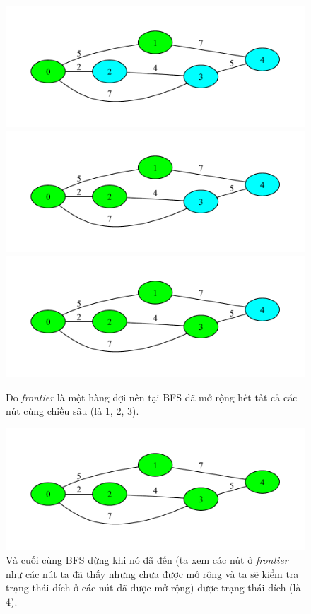 \begin{figure}[H]
    \centering
    \includegraphics[scale=0.7]{figure/BFS/2.pdf}
    \includegraphics[scale=0.7]{figure/BFS/3.pdf}
    \includegraphics[scale=0.7]{figure/BFS/4.pdf}
    \caption{Do \textit{frontier} là một hàng đợi nên tại BFS đã mở rộng hết tất cả các nút cùng chiều sâu (là $1$, $2$, $3$).}
    \label{fig:BFS_2_4}
\end{figure}

\begin{figure}[H]
    \centering
    \includegraphics[scale=0.8]{figure/BFS/5.pdf}
    \caption{Và cuối cùng BFS dừng khi nó đã đến (ta xem các nút ở \textit{frontier} như các nút ta đã thấy nhưng chưa được mở rộng và ta sẽ kiểm tra trạng thái đích ở các nút đã được mở rộng) được trạng thái đích (là $4$).}
    \label{fig:BFS_5}
\end{figure}


